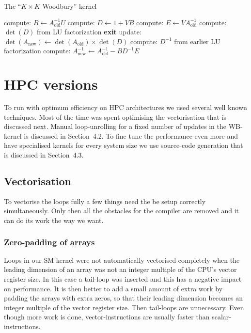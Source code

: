 \documentclass[11pt]{article}
\numberwithin{figure}{section}
\numberwithin{table}{section}
\begin{document}
      \begin{algorithm}[H]
        \caption{The ``$K\times K$ Woodbury'' kernel}\label{algo:woodbury}
        compute: $B \gets A_{\text{old}}^{-1} U$\;
        compute: $D \gets 1 + V B$\;
        compute: $E \gets V A_{\text{old}}^{-1}$\;
        compute: $\det(D)$ from LU factorization\;
        {
          \textbf{exit}\;
        }
        update: $\det(A_{\text{new}})\gets \det(A_{\text{old}})\times\det(D)$\;
        compute: $D^{-1}$ from earlier LU factorization\;
        compute: $A_{\text{new}}^{-1} \gets A_{\text{old}}^{-1}-BD^{-1}E$\;
      \end{algorithm}
		
  \section{HPC versions}
    To run with optimum efficiency on HPC architectures we used several well known techniques. Most of the time was spent optimising the vectorisation that is discussed next. Manual loop-unrolling for a fixed number of updates in the WB-kernel is discussed in Section~4.2. To fine tune the performance even more and have specialised kernels for every system size we use source-code generation that is discussed in Section~4.3.

    \subsection{Vectorisation}
        To vectorise the loops fully a few things need the be setup correctly simultaneously. Only then all the obstacles for the compiler are removed and it can do its work the way we want.
      \subsubsection{Zero-padding of arrays}
      Loops in our SM kernel were not automatically vectorised completely when the leading dimension of an array was not an integer multiple of the CPU's vector register size. In this case a tail-loop was inserted and this has a negative impact on performance. It is then better to add a small amount of extra work by padding the arrays with extra zeros, so that their leading dimension becomes an integer multiple of the vector register size. Then tail-loops are unnecessary. Even though more work is done, vector-instructions are usually faster than scalar-instructions.\\
				
\end{document}
